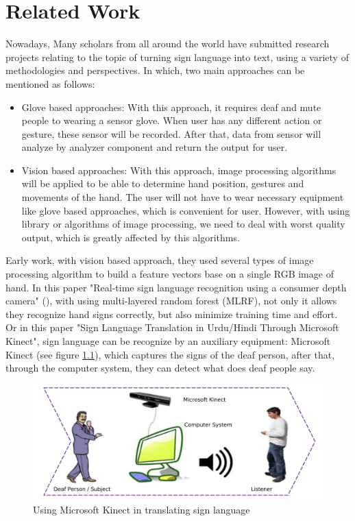 \chapter{Related Work}
  Nowadays, Many scholars from all around the world have submitted research 
  projects relating to the topic of turning sign language into text, 
  using a variety of methodologies and perspectives.
  In which, two main approaches can be mentioned as follows:
  \begin{itemize}
    \item Glove based approaches:
    With this approach, it requires deaf and mute people to wearing a sensor glove. When user
    has any different action or gesture, these sensor will be recorded. After that, data from
    sensor will analyze by analyzer component and return the output for user.
    \item Vision based approaches:
    With this approach, image processing algorithms will be applied to be able to determine
    hand position, gestures and movements of the hand. The user will not have to wear necessary
    equipment like glove based approaches, which is convenient for user. However, with using
    library or algorithms of image processing, we need to deal with worst quality output, which is
    greatly affected by this algorithms.
  \end{itemize}

  Early work, with vision based approach, they used several types of
  image processing algorithm to build a feature vectors base on a single RGB image of hand.
  In this paper "Real-time sign language recognition using a consumer depth camera" (\cite{kuznetsova2013real}),
  with using multi-layered random forest (MLRF), not only it allows they recognize hand signs
  correctly, but also minimize training time and effort. Or in this paper "Sign Language Translation in Urdu/Hindi Through
  Microsoft Kinect", sign language can be recognize by an auxiliary equipment: Microsoft Kinect (see figure \ref{fig:Chap2-MS-Kinect}), which captures
  the signs of the deaf person, after that, through the computer system, they can detect what does deaf people say.

  \begin{figure}[H]
    \centering
    \includegraphics[width=\textwidth]{img/Chap2/MS-Kinect.png}
    \caption{Using Microsoft Kinect in translating sign language}
    \label{fig:Chap2-MS-Kinect}
  \end{figure}


